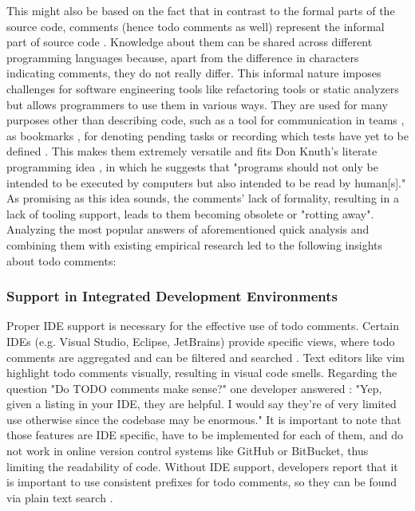 This might also be based on the fact that in contrast to the formal parts of the source code, comments (hence todo comments as well) represent the informal part of source code \cite{ying_source_2005, nie_framework_2019, sridhara_automatically_2016, storey_todo_2008}.
Knowledge about them can be shared across different programming languages because, apart from the difference in characters indicating comments, they do not really differ.
This informal nature imposes challenges for software engineering tools like refactoring tools or static analyzers but allows programmers to use them in various ways.
They are used for many purposes other than describing code, such as a tool for communication in teams \cite{ying_source_2005}, as bookmarks \cite{storey_how_2009}, for denoting pending tasks \cite{sridhara_automatically_2016} or recording which tests have yet to be defined \cite{storey_todo_2008}.
This makes them extremely versatile and fits Don Knuth's literate programming idea \cite{knuth_literate_1984}, in which he suggests that "programs should not only be intended to be executed by computers but also intended to be read by human[s]." \cite{ying_source_2005}
As promising as this idea sounds, the comments' lack of formality, resulting in a lack of tooling support, leads to them becoming obsolete or "rotting away".
Analyzing the most popular answers of aforementioned quick analysis \cite{karacic_todo_2015, snoop_does_2016, tackabury_how_2019, alecxe_how_2018, squires_use_2012} and combining them with existing empirical research \cite{ying_source_2005, nie_framework_2019, storey_how_2009} led to the following insights about todo comments:

\subsubsection{Support in Integrated Development Environments}
Proper IDE support is necessary for the effective use of todo comments.
Certain IDEs (e.g. Visual Studio, Eclipse, JetBrains) provide specific views, where todo comments are aggregated and can be filtered and searched \cite{storey_how_2009}.
Text editors like vim highlight todo comments visually, resulting in visual code smells.
Regarding the question "Do TODO comments make sense?" one developer answered \cite{karacic_todo_2015}: "Yep, given a listing in your IDE, they are helpful. I would say they're of very limited use otherwise since the codebase may be enormous."
It is important to note that those features are IDE specific, have to be implemented for each of them, and do not work in online version control systems like GitHub or BitBucket, thus limiting the readability of code.
Without IDE support, developers report that it is important to use consistent prefixes for todo comments, so they can be found via plain text search \cite{karacic_todo_2015}.

